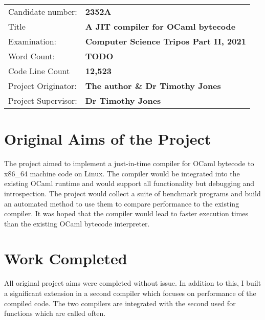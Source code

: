  {\large

  \begin{tabular}{ll}
      Candidate number:   & \textbf{2352A}                                 \\
      Title               & \textbf{A JIT compiler for OCaml bytecode}     \\
      Examination:        & \textbf{Computer Science Tripos Part II, 2021} \\
      Word Count:         & \textbf{TODO\footnotemark}                     \\
      Code Line Count     & \textbf{12,523\footnotemark}                   \\
      Project Originator: & \textbf{The author \& Dr Timothy Jones}        \\
      Project Supervisor: & \textbf{Dr Timothy Jones}                      \\
  \end{tabular}
 }

\section*{Original Aims of the Project}

The project aimed to implement a just-in-time compiler for OCaml bytecode to x86\_64 machine code
on
Linux. The compiler would be integrated into the existing OCaml runtime and would support all
functionality but debugging and introspection. The project would collect a suite of benchmark
programs
and build an automated method to use them to compare performance to the existing compiler. It was
hoped
that the compiler would lead to faster execution times than the existing OCaml bytecode
interpreter.

\section*{Work Completed}

All original project aims were completed without issue. In addition to this, I built a significant
extension in a second compiler which focuses on performance of the compiled code. The
two compilers are integrated with the second used for functions which are called often.

